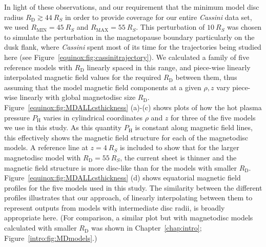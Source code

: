 In light of these observations, and our requirement that the minimum model disc radius $R_\mathrm{D} \gtrsim \SI{44}{R_S}$ in order to provide coverage for our entire \textit{Cassini} data set, we used $R_\mathrm{MIN} = \SI{45}{R_S}$ and $R_\mathrm{MAX}=\SI{55}{R_S}$. This perturbation of $\SI{10}{R_S}$ was chosen to simulate the perturbation in the magnetopause boundary particularly on the dusk flank, where \textit{Cassini} spent most of its time for the trajectories being studied here (see Figure~\ref{equinox:fig:cassinitrajectory}). We calculated a family of five reference models with $R_\mathrm{D}$ linearly spaced in this range, and piece-wise linearly interpolated magnetic field values for the required $R_\mathrm{D}$ between them, thus assuming that the model magnetic field components at a given $\rho,z$ vary piece-wise linearly with global magnetodisc size $R_\mathrm{D}$. Figure~\ref{equinox:fig:MDALLcsthickness} (a)-(c) shows plots of how the hot plasma pressure $P_\mathrm{H}$ varies in cylindrical coordinates $\rho$ and $z$ for three of the five models we use in this study. As this quantity $P_\mathrm{H}$ is constant along magnetic field lines, this effectively shows the magnetic field structure for each of the magnetodisc models. A reference line at $z=\SI{4}{R_S}$ is included to show that for the larger magnetodisc model with $R_\mathrm{D}=\SI{55}{R_S}$, the current sheet is thinner and the magnetic field structure is more disc-like than for the models with smaller $R_\mathrm{D}$. Figure~\ref{equinox:fig:MDALLcsthickness} (d) shows equatorial magnetic field profiles for the five models used in this study. The similarity between the different profiles illustrates that our approach, of linearly interpolating between them to represent outputs from models with intermediate disc radii, is broadly appropriate here. (For comparison, a similar plot but with magnetodisc models calculated with smaller $R_\mathrm{D}$ was shown in Chapter~\ref{chap:intro}; Figure~\ref{intro:fig:MDmodels}.)

